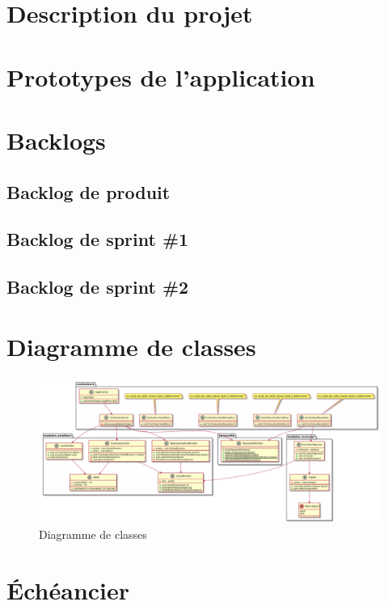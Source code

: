 \documentclass{article}
\begin{document}

\tableofcontents

\newpage

\section{Description du projet}
    

\section{Prototypes de l'application}
    

\newpage

\section{Backlogs}
    \subsection{Backlog de produit}
        

\newpage

    \subsection{Backlog de sprint \#1}
        
    \subsection{Backlog de sprint \#2}
        

\section{Diagramme de classes}
    \begin{figure}[ht!]
        \centering
        \caption{Diagramme de classes}
        \includegraphics[width=0.8\linewidth]{images/diagramme_classes.pdf}
    \end{figure}

\section{Échéancier}
    
\end{document}
